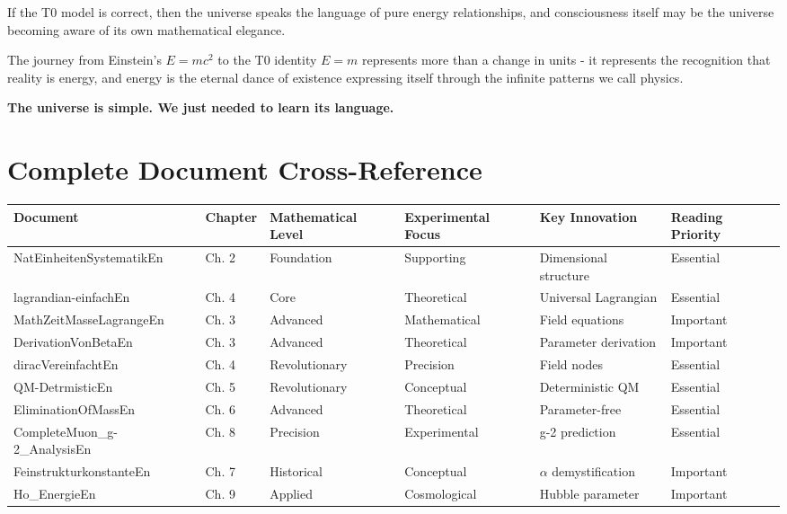 \documentclass[12pt,a4paper]{report}
\begin{document}
	If the T0 model is correct, then the universe speaks the language of pure energy relationships, and consciousness itself may be the universe becoming aware of its own mathematical elegance.
	
	The journey from Einstein's $E = mc^2$ to the T0 identity $E = m$ represents more than a change in units - it represents the recognition that reality is energy, and energy is the eternal dance of existence expressing itself through the infinite patterns we call physics.
	
	\textbf{The universe is simple. We just needed to learn its language.}
	
	\appendix
	
	\chapter{Complete Document Cross-Reference}
	
	\begin{landscape}
		\begin{longtable}{|p{5cm}|p{3cm}|p{3cm}|p{3cm}|p{3cm}|p{3cm}|}
			\hline
			\textbf{Document} & \textbf{Chapter} & \textbf{Mathematical Level} & \textbf{Experimental Focus} & \textbf{Key Innovation} & \textbf{Reading Priority} \\
			\hline
			NatEinheitenSystematikEn & Ch. 2 & Foundation & Supporting & Dimensional structure & Essential \\
			\hline
			lagrandian-einfachEn & Ch. 4 & Core & Theoretical & Universal Lagrangian & Essential \\
			\hline
			MathZeitMasseLagrangeEn & Ch. 3 & Advanced & Mathematical & Field equations & Important \\
			\hline
			DerivationVonBetaEn & Ch. 3 & Advanced & Theoretical & Parameter derivation & Important \\
			\hline
			diracVereinfachtEn & Ch. 4 & Revolutionary & Precision & Field nodes & Essential \\
			\hline
			QM-DetrmisticEn & Ch. 5 & Revolutionary & Conceptual & Deterministic QM & Essential \\
			\hline
			EliminationOfMassEn & Ch. 6 & Advanced & Theoretical & Parameter-free & Essential \\
			\hline
			CompleteMuon\_g-2\_AnalysisEn & Ch. 8 & Precision & Experimental & g-2 prediction & Essential \\
			\hline
			FeinstrukturkonstanteEn & Ch. 7 & Historical & Conceptual & $\alpha$ demystification & Important \\
			\hline
			Ho\_EnergieEn & Ch. 9 & Applied & Cosmological & Hubble parameter & Important \\
			\hline
		\end{longtable}
	\end{landscape}
	
\end{document}
